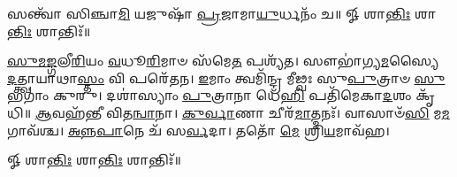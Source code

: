 𑌸𑌨𑍍𑌤𑍍𑌵𑌾᳴ 𑌸𑌿𑌞𑍍𑌚𑌾\-\ul{𑌮𑌿} 𑌯𑌜𑍁𑌷𑌾᳴ \ul{𑌪𑍍𑌰}\-𑌜𑌾𑌮𑌾\-\ul{𑌯𑍁}\-𑌰𑍍𑌧𑌨𑌂᳴ 𑌚॥ 𑍐 𑌶𑌾\-\ul{𑌨𑍍𑌤𑌿𑌃} 𑌶𑌾\-\ul{𑌨𑍍𑌤𑌿𑌃} 𑌶𑌾𑌨𑍍𑌤𑌿𑌃᳴॥

\-\ul{𑌸𑍁}\-\-\ul{𑌮}\-\-\ul{𑌙𑍍𑌗}\-𑌲𑍀\-\ul{𑌰𑌿}\-𑌯𑌂 \ul{𑌵}\-𑌧𑍂\-\ul{𑌰𑌿}\-𑌮𑌾𑍞 𑌸᳴𑌮𑍇\-\ul{𑌤} 𑌪𑌶𑍍𑌯᳴𑌤। 
𑌸𑍗𑌭𑌾॑𑌗𑍍𑌯\-\ul{𑌮}\-𑌸𑍍𑌯𑍈 \ul{𑌦}\-𑌤𑍍𑌤𑍍𑌵𑌾𑌯𑌾𑌥𑌾\-\ul{𑌸𑍍𑌤𑌂} 𑌵𑌿 𑌪𑌰𑍇᳴𑌤𑌨। 
\-\ul{𑌇}\-𑌮𑌾𑌂 𑌤𑍍𑌵𑌮𑌿᳴𑌨𑍍𑌦𑍍𑌰 𑌮𑍀𑌢𑍍𑌵𑌃 𑌸𑍁\-\ul{𑌪𑍁}\-𑌤𑍍𑌰𑌾𑍞 \ul{𑌸𑍁}\-𑌭𑌗𑌾𑌂॑ 𑌕𑍁𑌰𑍁। 
𑌦𑌶𑌾॑𑌸𑍍𑌯𑌾𑌂 \ul{𑌪𑍁}\-𑌤𑍍𑌰𑌾𑌨𑌾 𑌧𑍇᳴\-\ul{𑌹𑌿} 𑌪𑌤𑌿᳴𑌮𑍇𑌕𑌾\-\ul{𑌦}\-𑌶𑌂 𑌕𑍃᳴𑌧𑌿॥ \ul{𑌆}\-𑌵𑌹᳴𑌨𑍍𑌤𑍀 𑌵𑌿𑌤\-\ul{𑌨𑍍𑌵𑌾}\-𑌨𑌾। 
\-\ul{𑌕𑍁}\-\-\ul{𑌰𑍍𑌵𑌾}\-𑌣𑌾 𑌚𑍀𑌰᳴\-\ul{𑌮𑌾}\-𑌤𑍍𑌮𑌨𑌃᳴। 
𑌵𑌾𑌸𑌾𑍞᳴\-\ul{𑌸𑌿} 𑌮\-\ul{𑌮} 𑌗𑌾𑌵᳴𑌶𑍍𑌚। 
\-\ul{𑌅}\-\-\ul{𑌨𑍍𑌨}\-\-\ul{𑌪𑌾}\-𑌨𑍇 𑌚᳴ 𑌸\-\ul{𑌰𑍍𑌵}\-𑌦𑌾। 
𑌤𑌤𑍋᳴ \ul{𑌮𑍇} 𑌶𑍍𑌰𑌿\-\ul{𑌯}\-𑌮𑌾𑌵᳴𑌹।

𑍐 𑌶𑌾\-\ul{𑌨𑍍𑌤𑌿𑌃} 𑌶𑌾\-\ul{𑌨𑍍𑌤𑌿𑌃} 𑌶𑌾𑌨𑍍𑌤𑌿𑌃᳴॥

\closesection
